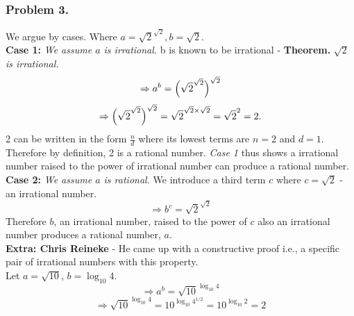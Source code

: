 \documentclass{article}
\begin{document}
\subsubsection{Problem 3.}
We argue by cases. Where \(a = \sqrt{2}^{\sqrt{2}}, b = \sqrt{2}\).
\\[5pt]
\textbf{Case 1:} \textit{We assume $a$ is irrational.}
b is known to be irrational - \textbf{Theorem.} \textit{$\sqrt{2}$ is irrational.} 
\[\Rightarrow a^{b} = \Bigl(\sqrt{2}^{\sqrt{2}}\Bigr)^{\sqrt{2}}\]
\[\Rightarrow \Bigl(\sqrt{2}^{\sqrt{2}}\Bigr)^{\sqrt{2}} = \sqrt{2}^{\sqrt{2} \times \sqrt{2}} = \sqrt{2}^{2} = 2.\]
2 can be written in the form $\frac{n}{d}$ where its lowest terms are $n = 2$ and $d = 1$. Therefore by definition, 2 is a rational number. \textit{Case 1} thus shows a irrational number raised to the power of irrational number can produce a rational number.
\\[5pt]
\noindent
\textbf{Case 2:} \textit{We assume $a$ is rational.} We introduce a third term $c$ where $c = \sqrt{2}$ - an irrational number. 
\[\Rightarrow b^{c} = \sqrt{2}^{\sqrt{2}}\]
Therefore $b$, an irrational number, raised to the power of $c$ also an irrational number produces a rational number, $a$.
\\[5pt]
\noindent
\textbf{Extra: Chris Reineke} - He came up with a constructive proof i.e., a specific pair of irrational numbers with this property. 
\\[5pt]
\noindent
Let $a = \sqrt{10}$,  $b = \log_{10}4$.
\[\Rightarrow a^{b} = \sqrt{10}^{\log_{10}4}\]
\[\Rightarrow \sqrt{10}^{\log_{10}4} = 10^{\log_{10}4^{1/2}} = 10^{\log_{10}2} = 2\]
\end{document}
